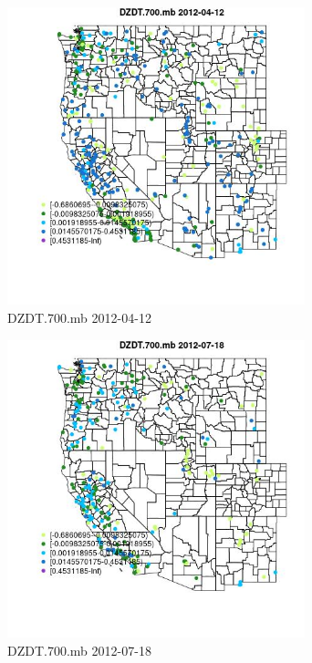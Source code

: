 \begin{figure} 
\centering  
\includegraphics[width=0.77\textwidth]{Code_Outputs/Report_ML_input_PM25_Step4_part_e_de_duplicated_aves_compiled_2019-05-14wNAs_MapObsDZDT700mb2012-04-12.jpg} 
\caption{\label{fig:Report_ML_input_PM25_Step4_part_e_de_duplicated_aves_compiled_2019-05-14wNAsMapObsDZDT700mb2012-04-12}DZDT.700.mb 2012-04-12} 
\end{figure} 
 

\begin{figure} 
\centering  
\includegraphics[width=0.77\textwidth]{Code_Outputs/Report_ML_input_PM25_Step4_part_e_de_duplicated_aves_compiled_2019-05-14wNAs_MapObsDZDT700mb2012-07-18.jpg} 
\caption{\label{fig:Report_ML_input_PM25_Step4_part_e_de_duplicated_aves_compiled_2019-05-14wNAsMapObsDZDT700mb2012-07-18}DZDT.700.mb 2012-07-18} 
\end{figure} 
 

